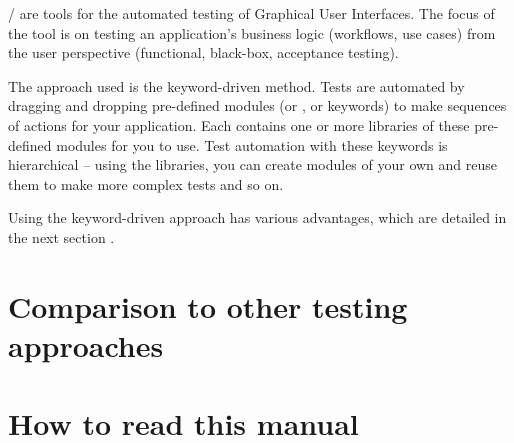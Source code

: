 
\gd{}/\jb{} are tools for the automated testing of Graphical User Interfaces. The focus of the tool is on testing an application's business logic (workflows, use cases)  from the user perspective (functional, black-box, acceptance testing).
 
The approach used is the keyword-driven method. Tests are automated by dragging and dropping pre-defined modules (or \gdcases{}, or keywords) to make sequences of actions for your application. Each \gdproject{}  contains one or more libraries of these pre-defined modules for you to use. Test automation with these keywords is hierarchical -- using the libraries, you can create modules of your own and reuse them to make more complex tests and so on. 

Using the keyword-driven approach has various advantages, which are detailed in the next section . 

\section{Comparison to other testing approaches}

\clearpage

\section{How to read this manual}

\clearpage




